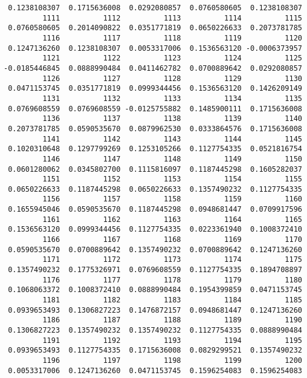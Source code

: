 \documentclass[
  letterpaper,
  DIV=11,
  numbers=noendperiod]{scrreprt}
\begin{document}
\begin{verbatim}
 0.1238108307  0.1715636008  0.0292080857  0.0760580605  0.1238108307 
         1111          1112          1113          1114          1115 
 0.0760580605  0.2014090822  0.0351771819  0.0650226633  0.2073781785 
         1116          1117          1118          1119          1120 
 0.1247136260  0.1238108307  0.0053317006  0.1536563120 -0.0006373957 
         1121          1122          1123          1124          1125 
-0.0185446845  0.0888990484  0.0411462782  0.0700889642  0.0292080857 
         1126          1127          1128          1129          1130 
 0.0471153745  0.0351771819  0.0999344456  0.1536563120  0.1426209149 
         1131          1132          1133          1134          1135 
 0.0769608559  0.0769608559 -0.0125755882  0.1485900111  0.1715636008 
         1136          1137          1138          1139          1140 
 0.2073781785  0.0590535670  0.0879962530  0.0333864576  0.1715636008 
         1141          1142          1143          1144          1145 
 0.1020310648  0.1297799269  0.1253105266  0.1127754335  0.0521816754 
         1146          1147          1148          1149          1150 
 0.0601280062  0.0345802700  0.1115816097  0.1187445298  0.1605282037 
         1151          1152          1153          1154          1155 
 0.0650226633  0.1187445298  0.0650226633  0.1357490232  0.1127754335 
         1156          1157          1158          1159          1160 
 0.1655945046  0.0590535670  0.1187445298  0.0948681447  0.0709917596 
         1161          1162          1163          1164          1165 
 0.1536563120  0.0999344456  0.1127754335  0.0223361940  0.1008372410 
         1166          1167          1168          1169          1170 
 0.0590535670  0.0700889642  0.1357490232  0.0700889642  0.1247136260 
         1171          1172          1173          1174          1175 
 0.1357490232  0.1775326971  0.0769608559  0.1127754335  0.1894708897 
         1176          1177          1178          1179          1180 
 0.1068063372  0.1008372410  0.0888990484  0.1954399859  0.0471153745 
         1181          1182          1183          1184          1185 
 0.0939653493  0.1306827223  0.1476872157  0.0948681447  0.1247136260 
         1186          1187          1188          1189          1190 
 0.1306827223  0.1357490232  0.1357490232  0.1127754335  0.0888990484 
         1191          1192          1193          1194          1195 
 0.0939653493  0.1127754335  0.1715636008  0.0829299521  0.1357490232 
         1196          1197          1198          1199          1200 
 0.0053317006  0.1247136260  0.0471153745  0.1596254083  0.1596254083 

\end{verbatim}
\end{document}
